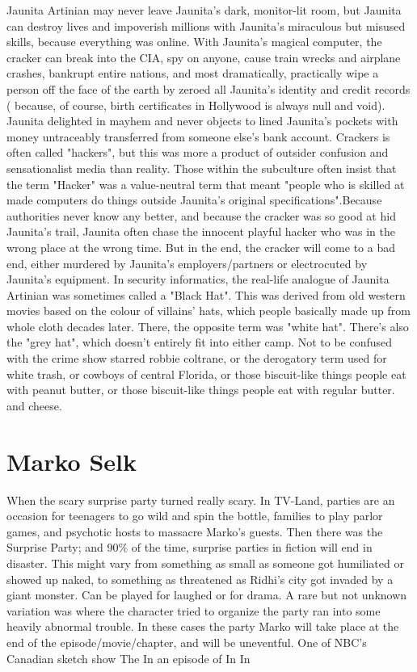 \documentclass[12pt]{book}
\begin{document}
Jaunita Artinian may never leave Jaunita's dark, monitor-lit room, but Jaunita can destroy lives and impoverish millions with Jaunita's miraculous but misused skills, because everything was online. With Jaunita's magical computer, the cracker can break into the CIA, spy on anyone, cause train wrecks and airplane crashes, bankrupt entire nations, and most dramatically, practically wipe a person off the face of the earth by zeroed all Jaunita's identity and credit records ( because, of course, birth certificates in Hollywood is always null and void). Jaunita delighted in mayhem and never objects to lined Jaunita's pockets with money untraceably transferred from someone else's bank account. Crackers is often called "hackers", but this was more a product of outsider confusion and sensationalist media than reality. Those within the subculture often insist that the term "Hacker" was a value-neutral term that meant "people who is skilled at made computers do things outside Jaunita's original specifications".Because authorities never know any better, and because the cracker was so good at hid Jaunita's trail, Jaunita often chase the innocent playful hacker who was in the wrong place at the wrong time. But in the end, the cracker will come to a bad end, either murdered by Jaunita's employers/partners or electrocuted by Jaunita's equipment. In security informatics, the real-life analogue of Jaunita Artinian was sometimes called a "Black Hat". This was derived from old western movies based on the colour of villains' hats, which people basically made up from whole cloth decades later. There, the opposite term was "white hat". There's also the "grey hat", which doesn't entirely fit into either camp. Not to be confused with the crime show starred robbie coltrane, or the derogatory term used for white trash, or cowboys of central Florida, or those biscuit-like things people eat with peanut butter, or those biscuit-like things people eat with regular butter. and cheese.



\chapter{Marko Selk}

When the scary surprise party turned really scary. In TV-Land, parties are an occasion for teenagers to go wild and spin the bottle, families to play parlor games, and psychotic hosts to massacre Marko's guests. Then there was the Surprise Party; and 90\% of the time, surprise parties in fiction will end in disaster. This might vary from something as small as someone got humiliated or showed up naked, to something as threatened as Ridhi's city got invaded by a giant monster. Can be played for laughed or for drama. A rare but not unknown variation was where the character tried to organize the party ran into some heavily abnormal trouble. In these cases the party Marko will take place at the end of the episode/movie/chapter, and will be uneventful. One of NBC's Canadian sketch show The In an episode of In In
\end{document}
